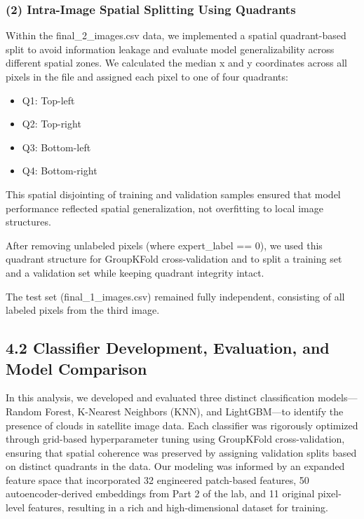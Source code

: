 \documentclass[11pt]{article}
\providecommand{\tightlist}{%
      \setlength{\itemsep}{0pt}\setlength{\parskip}{0pt}}
\begin{document}
\subsubsection*{(2) Intra-Image Spatial Splitting Using
Quadrants}\label{intra-image-spatial-splitting-using-quadrants}

Within the final\_2\_images.csv data, we implemented a spatial
quadrant-based split to avoid information leakage and evaluate model
generalizability across different spatial zones. We calculated the
median x and y coordinates across all pixels in the file and assigned
each pixel to one of four quadrants:

\begin{itemize}
\tightlist
\item
  Q1: Top-left
\item
  Q2: Top-right
\item
  Q3: Bottom-left
\item
  Q4: Bottom-right
\end{itemize}

This spatial disjointing of training and validation samples ensured that
model performance reflected spatial generalization, not overfitting to
local image structures.

After removing unlabeled pixels (where expert\_label == 0), we used this
quadrant structure for GroupKFold cross-validation and to split a
training set and a validation set while keeping quadrant integrity
intact.

The test set (final\_1\_images.csv) remained fully independent,
consisting of all labeled pixels from the third image.

    \subsection*{4.2 Classifier Development, Evaluation, and Model
Comparison}\label{classifier-development-evaluation-and-model-comparison}

In this analysis, we developed and evaluated three distinct
classification models---Random Forest, K-Nearest Neighbors (KNN), and
LightGBM---to identify the presence of clouds in satellite image data.
Each classifier was rigorously optimized through grid-based
hyperparameter tuning using GroupKFold cross-validation, ensuring that
spatial coherence was preserved by assigning validation splits based on
distinct quadrants in the data. Our modeling was informed by an expanded
feature space that incorporated 32 engineered patch-based features, 50
autoencoder-derived embeddings from Part 2 of the lab, and 11 original
pixel-level features, resulting in a rich and high-dimensional dataset
for training.
\end{document}
